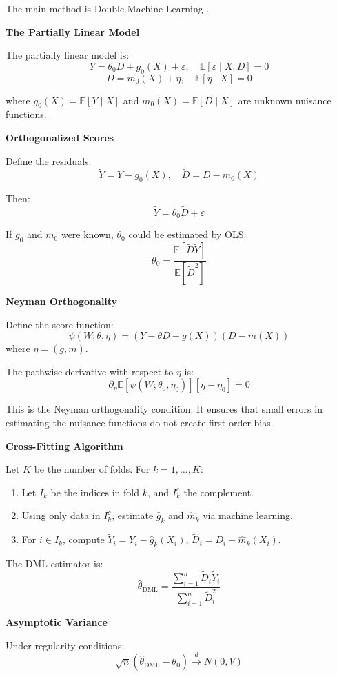 The main method is Double Machine Learning \citep{chernozhukov2018double}.

\textbf{The Partially Linear Model}

The partially linear model is:
\[
Y = \theta_0 D + g_0(X) + \varepsilon, \quad \mathbb{E}[\varepsilon \mid X, D] = 0
\]
\[
D = m_0(X) + \eta, \quad \mathbb{E}[\eta \mid X] = 0
\]

where $g_0(X) = \mathbb{E}[Y \mid X]$ and $m_0(X) = \mathbb{E}[D \mid X]$ are unknown nuisance functions.

\textbf{Orthogonalized Scores}

Define the residuals:
\[
\tilde{Y} = Y - g_0(X), \quad \tilde{D} = D - m_0(X)
\]

Then:
\[
\tilde{Y} = \theta_0 \tilde{D} + \varepsilon
\]

If $g_0$ and $m_0$ were known, $\theta_0$ could be estimated by OLS:
\[
\theta_0 = \frac{\mathbb{E}[\tilde{D} \tilde{Y}]}{\mathbb{E}[\tilde{D}^2]}
\]

\textbf{Neyman Orthogonality}

Define the score function:
\[
\psi(W; \theta, \eta) = (Y - \theta D - g(X))(D - m(X))
\]
where $\eta = (g, m)$.

The pathwise derivative with respect to $\eta$ is:
\[
\partial_\eta \mathbb{E}[\psi(W; \theta_0, \eta_0)] [\eta - \eta_0] = 0
\]

This is the Neyman orthogonality condition. It ensures that small errors in estimating the nuisance functions do not create first-order bias.

\textbf{Cross-Fitting Algorithm}

Let $K$ be the number of folds. For $k = 1, \ldots, K$:

\begin{enumerate}
	\item Let $I_k$ be the indices in fold $k$, and $I_k^c$ the complement.
	\item Using only data in $I_k^c$, estimate $\hat{g}_k$ and $\hat{m}_k$ via machine learning.
	\item For $i \in I_k$, compute $\tilde{Y}_i = Y_i - \hat{g}_k(X_i)$, $\tilde{D}_i = D_i - \hat{m}_k(X_i)$.
\end{enumerate}

The DML estimator is:
\[
\hat{\theta}_{\text{DML}} = \frac{\sum_{i=1}^n \tilde{D}_i \tilde{Y}_i}{\sum_{i=1}^n \tilde{D}_i^2}
\]

\textbf{Asymptotic Variance}

Under regularity conditions:
\[
\sqrt{n}(\hat{\theta}_{\text{DML}} - \theta_0) \xrightarrow{d} N(0, V)
\]

